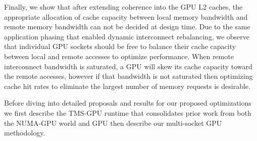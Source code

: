 Finally, we show that after extending coherence into the GPU L2 caches, the
appropriate allocation of cache capacity between local memory bandwidth and
remote memory bandwidth can not be decided at design time.  Due to the same
application phasing that enabled dynamic interconnect rebalancing, we observe
that individual GPU sockets should be free to balance their cache capacity
between local and remote accesses to optimize performance.  When remote
interconnect bandwidth is saturated, a GPU will skew its cache capacity toward
the remote accesses,  however if that bandwidth is not saturated then
optimizing cache hit rates to eliminate the largest number of memory requests
is desirable.

Before diving into detailed proposals and results for our proposed
optimizations we first describe the TMS-GPU runtime that consolidates
prior work from both the NUMA-GPU world and GPU then describe our multi-socket
GPU methodology.


